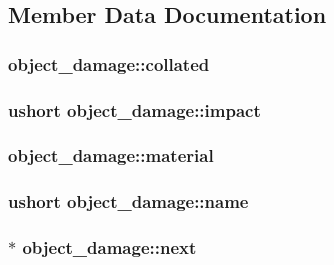 \subsection{Member Data Documentation}
\hypertarget{structobject__damage_aba937db838e9b0413cbabe8785e9b816}{
\subsubsection[{collated}]{ object\-\_\-damage\-::collated}}\label{structobject__damage_aba937db838e9b0413cbabe8785e9b816}
\hypertarget{structobject__damage_a96b1eb5eecd0f396ff5c09f6bdda35d2}{
\subsubsection[{impact}]{\setlength{\rightskip}{0pt plus 5cm}ushort object\-\_\-damage\-::impact}}\label{structobject__damage_a96b1eb5eecd0f396ff5c09f6bdda35d2}
\hypertarget{structobject__damage_ad76ebd37225ccd91c58b09cc327b2421}{
\subsubsection[{material}]{ object\-\_\-damage\-::material}}\label{structobject__damage_ad76ebd37225ccd91c58b09cc327b2421}
\hypertarget{structobject__damage_afc74f4142ac05326ca2e12999229d746}{
\subsubsection[{name}]{\setlength{\rightskip}{0pt plus 5cm}ushort object\-\_\-damage\-::name}}\label{structobject__damage_afc74f4142ac05326ca2e12999229d746}
\hypertarget{structobject__damage_ab2a2e8b2f379bd963dd85c903e407ed3}{
\subsubsection[{next}]{$\ast$ object\-\_\-damage\-::next}}\label{structobject__damage_ab2a2e8b2f379bd963dd85c903e407ed3}
